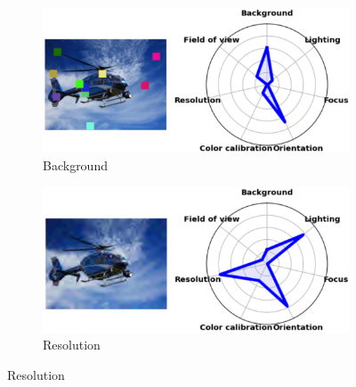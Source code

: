 \begin{figure}[ht]
    \begin{subfigure}[b]{0.48\textwidth}
        \includegraphics[width=\textwidth]{img/ood/2b.png}
        \caption{Background}
        \label{fig:2b}
    \end{subfigure}
    \hfill
    \begin{subfigure}[b]{0.48\textwidth}
        \includegraphics[width=\textwidth]{img/ood/2r.png}
        \caption{Resolution}
        \label{fig:2r}
    \end{subfigure}


\end{figure}
